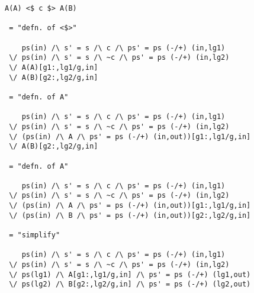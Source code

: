 \newpage
{}

\begin{verbatim}
A(A) <$ c $> A(B)

 = "defn. of <$>"

    ps(in) /\ s' = s /\ c /\ ps' = ps (-/+) (in,lg1)
 \/ ps(in) /\ s' = s /\ ~c /\ ps' = ps (-/+) (in,lg2)
 \/ A(A)[g1:,lg1/g,in]
 \/ A(B)[g2:,lg2/g,in]

 = "defn. of A"

    ps(in) /\ s' = s /\ c /\ ps' = ps (-/+) (in,lg1)
 \/ ps(in) /\ s' = s /\ ~c /\ ps' = ps (-/+) (in,lg2)
 \/ (ps(in) /\ A /\ ps' = ps (-/+) (in,out))[g1:,lg1/g,in]
 \/ A(B)[g2:,lg2/g,in]

 = "defn. of A"

    ps(in) /\ s' = s /\ c /\ ps' = ps (-/+) (in,lg1)
 \/ ps(in) /\ s' = s /\ ~c /\ ps' = ps (-/+) (in,lg2)
 \/ (ps(in) /\ A /\ ps' = ps (-/+) (in,out))[g1:,lg1/g,in]
 \/ (ps(in) /\ B /\ ps' = ps (-/+) (in,out))[g2:,lg2/g,in]

 = "simplify"

    ps(in) /\ s' = s /\ c /\ ps' = ps (-/+) (in,lg1)
 \/ ps(in) /\ s' = s /\ ~c /\ ps' = ps (-/+) (in,lg2)
 \/ ps(lg1) /\ A[g1:,lg1/g,in] /\ ps' = ps (-/+) (lg1,out)
 \/ ps(lg2) /\ B[g2:,lg2/g,in] /\ ps' = ps (-/+) (lg2,out)
\end{verbatim}

\newpage
{}

